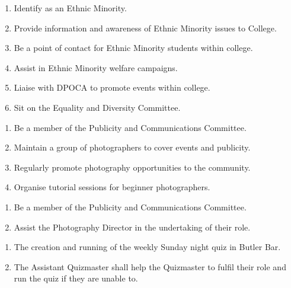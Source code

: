\begin{enumerate}
    \item Identify as an Ethnic Minority.
    \item Provide information and awareness of Ethnic Minority issues to College.
    \item Be a point of contact for Ethnic Minority students within college.
    \item Assist in Ethnic Minority welfare campaigns.
    \item Liaise with DPOCA to promote events within college.
    \item Sit on the Equality and Diversity Committee.
    
\end{enumerate}

\begin{enumerate}
    \item Be a member of the Publicity and Communications Committee.
    \item Maintain a group of photographers to cover events and publicity.
    \item Regularly promote photography opportunities to the community.
    \item Organise tutorial sessions for beginner photographers.
\end{enumerate}

\begin{enumerate}
    \item Be a member of the Publicity and Communications Committee.
    \item Assist the Photography Director in the undertaking of their role. 
\end{enumerate}

\begin{enumerate}
    \item The creation and running of the weekly Sunday night quiz in Butler Bar.
    \item The Assistant Quizmaster shall help the Quizmaster to fulfil their role and run the quiz if they are unable to.
    
\end{enumerate}

